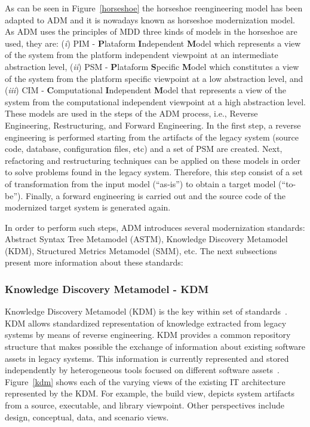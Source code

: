 \documentclass[a4paper,twoside]{article}
\begin{document}
As can be seen in Figure~\ref{horseshoe} the horseshoe reengineering model has been adapted to ADM and it is nowadays known as horseshoe modernization model. As ADM uses the principles of MDD three kinds of models in the horseshoe are used, they are: (\textit{i}) PIM - \textbf{P}lataform \textbf{I}ndependent \textbf{M}odel which represents a view of the system from the platform independent viewpoint at an intermediate abstraction level, (\textit{ii}) PSM - \textbf{P}lataform \textbf{S}pecific \textbf{M}odel which constitutes a view of the system from the platform specific viewpoint at a low abstraction level, and (\textit{iii}) CIM - \textbf{C}omputational \textbf{I}ndependent \textbf{M}odel that represents a view of the system from the computational independent viewpoint at a high abstraction level. These models are used in the steps of the ADM process, i.e., Reverse Engineering, Restructuring, and Forward Engineering. In the first step, a reverse engineering is performed starting from the artifacts of the legacy system (source code, database, configuration files, etc) and a set of PSM are created. Next, refactoring and restructuring techniques can be applied on these models in order to solve problems found in the legacy system. Therefore, this step consist of a set of transformation from the input model (``as-is'') to obtain a target model (``to-be''). Finally, a forward engineering is carried out and the source code of the modernized target system is generated again. 


In order to perform such steps, ADM introduces several modernization standards: Abstract Syntax Tree Metamodel (ASTM), Knowledge Discovery Metamodel (KDM), Structured Metrics Metamodel (SMM), etc. The next subsections present more information about these standards:



\subsubsection{Knowledge Discovery Metamodel - KDM}\label{subsec:KDM}

Knowledge Discovery Metamodel (KDM) is the key within set of standards~\cite{1686216}. KDM allows standardized representation of knowledge extracted from legacy systems by means of reverse engineering. KDM provides a common repository structure that makes possible the exchange of information about existing software assets in legacy systems. This information is currently represented and stored independently by heterogeneous tools focused on different software assets~\cite[p.~32]{Ulrich:2010:IST:1841736}. Figure~\ref{kdm} shows each of the varying views of the existing IT architecture represented by the KDM. For example, the build view, depicts system artifacts from a source, executable, and library viewpoint. Other perspectives include design, conceptual, data, and scenario views.
\end{document}
